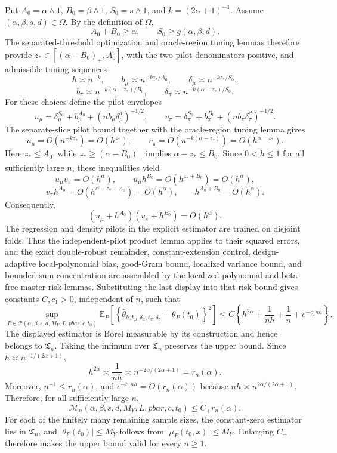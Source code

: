 Put \(A_0=\alpha\wedge1\), \(B_0=\beta\wedge1\), \(S_0=s\wedge1\), and \(k=(2\alpha+1)^{-1}\). Assume \((\alpha,\beta,s,d)\in\Omega\). By the definition of \(\Omega\),
\[
A_0+B_0\ge\alpha,
\qquad
S_0\ge g(\alpha,\beta,d).
\]
The separated-threshold optimization and oracle-region tuning lemmas therefore provide \(z_*\in[(\alpha-B_0)_+,A_0]\), with the two pilot denominators positive, and admissible tuning sequences
\[
h\asymp n^{-k},
\qquad
b_\mu\asymp n^{-kz_*/A_0},
\qquad
\delta_\mu\asymp n^{-kz_*/S_0},
\]
\[
b_\pi\asymp n^{-k(\alpha-z_*)/B_0},
\qquad
\delta_\pi\asymp n^{-k(\alpha-z_*)/S_0}.
\]
For these choices define the pilot envelopes
\[
u_\mu
=\delta_\mu^{S_0}+b_\mu^{A_0}
+(n b_\mu\delta_\mu^d)^{-1/2},
\qquad
v_\pi
=\delta_\pi^{S_0}+b_\pi^{B_0}
+(n b_\pi\delta_\pi^d)^{-1/2}.
\]
The separate-slice pilot bound together with the oracle-region tuning lemma gives
\[
u_\mu=O(n^{-kz_*})=O(h^{z_*}),
\qquad
v_\pi=O(n^{-k(\alpha-z_*)})=O(h^{\alpha-z_*}).
\]
Here \(z_*\le A_0\), while \(z_*\ge(\alpha-B_0)_+\) implies \(\alpha-z_*\le B_0\). Since \(0<h\le1\) for all sufficiently large \(n\), these inequalities yield
\[
u_\mu v_\pi=O(h^\alpha),
\qquad
u_\mu h^{B_0}=O(h^{z_*+B_0})=O(h^\alpha),
\]
\[
v_\pi h^{A_0}=O(h^{\alpha-z_*+A_0})=O(h^\alpha),
\qquad
h^{A_0+B_0}=O(h^\alpha).
\]
Consequently,
\[
(u_\mu+h^{A_0})(v_\pi+h^{B_0})=O(h^\alpha).
\]
The regression and density pilots in the explicit estimator are trained on disjoint folds. Thus the independent-pilot product lemma applies to their squared errors, and the exact double-robust remainder, constant-extension control, design-adaptive local-polynomial bias, good-Gram bound, localized variance bound, and bounded-sum concentration are assembled by the localized-polynomial and beta-free master-risk lemmas. Substituting the last display into that risk bound gives constants \(C,c_1>0\), independent of \(n\), such that
\[
\sup_{P\in\mathcal P(\alpha,\beta,s,d,M_Y,L,pbar,c,t_0)}
\mathbb E_P\!\left[
\left\{\widehat\theta_{h,b_\mu,\delta_\mu,b_\pi,\delta_\pi}
-\theta_P(t_0)\right\}^2
\right]
\le
C\left\{h^{2\alpha}+\frac1{nh}+\frac1n+e^{-c_1nh}\right\}.
\]
The displayed estimator is Borel measurable by its construction and hence belongs to \(\mathfrak T_n\). Taking the infimum over \(\mathfrak T_n\) preserves the upper bound. Since \(h\asymp n^{-1/(2\alpha+1)}\),
\[
h^{2\alpha}\asymp\frac1{nh}
\asymp n^{-2\alpha/(2\alpha+1)}=r_n(\alpha).
\]
Moreover, \(n^{-1}\le r_n(\alpha)\), and \(e^{-c_1nh}=O(r_n(\alpha))\) because \(nh\asymp n^{2\alpha/(2\alpha+1)}\). Therefore, for all sufficiently large \(n\),
\[
\mathcal M_n(\alpha,\beta,s,d,M_Y,L,pbar,c,t_0)
\le C_+r_n(\alpha).
\]
For each of the finitely many remaining sample sizes, the constant-zero estimator lies in \(\mathfrak T_n\), and \(\lvert\theta_P(t_0)\rvert\le M_Y\) follows from \(\lvert\mu_P(t_0,x)\rvert\le M_Y\). Enlarging \(C_+\) therefore makes the upper bound valid for every \(n\ge1\).

